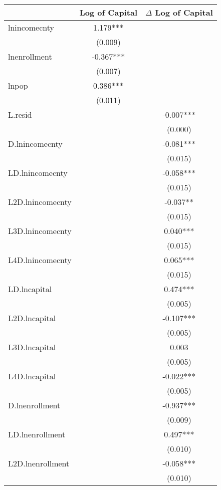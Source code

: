 \begin{tabular}{lcc}
\hline
 & Log of Capital & $\Delta$ Log of Capital \\ 
\hline
lnincomecnty        & 1.179*** &  \\
                    & (0.009)  &  \\
lnenrollment        & -0.367*** &  \\
                    & (0.007)  &  \\
lnpop               & 0.386*** &  \\
                    & (0.011)  &  \\
L.resid             &  & -0.007*** \\
                    &  & (0.000) \\
D.lnincomecnty      &  & -0.081*** \\
                    &  & (0.015) \\
LD.lnincomecnty     &  & -0.058*** \\
                    &  & (0.015) \\
L2D.lnincomecnty    &  & -0.037** \\
                    &  & (0.015) \\
L3D.lnincomecnty    &  & 0.040*** \\
                    &  & (0.015) \\
L4D.lnincomecnty    &  & 0.065*** \\
                    &  & (0.015) \\
LD.lncapital        &  & 0.474*** \\
                    &  & (0.005) \\
L2D.lncapital       &  & -0.107*** \\
                    &  & (0.005) \\
L3D.lncapital       &  & 0.003 \\
                    &  & (0.005) \\
L4D.lncapital       &  & -0.022*** \\
                    &  & (0.005) \\
D.lnenrollment      &  & -0.937*** \\
                    &  & (0.009) \\
LD.lnenrollment     &  & 0.497*** \\
                    &  & (0.010) \\
L2D.lnenrollment    &  & -0.058*** \\
                    &  & (0.010) \\

\end{tabular}

